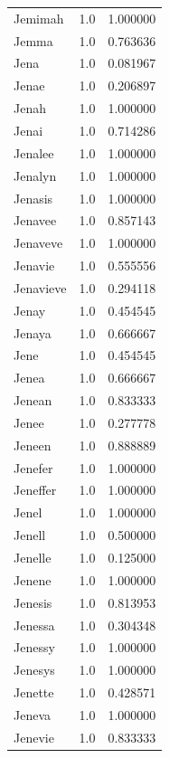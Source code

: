 \documentclass[
  letterpaper,
  DIV=11,
  numbers=noendperiod]{scrreprt}
\begin{document}
\begin{tabular}{lrr}
Jemimah         &   1.0 &   1.000000 \\
Jemma           &   1.0 &   0.763636 \\
Jena            &   1.0 &   0.081967 \\
Jenae           &   1.0 &   0.206897 \\
Jenah           &   1.0 &   1.000000 \\
Jenai           &   1.0 &   0.714286 \\
Jenalee         &   1.0 &   1.000000 \\
Jenalyn         &   1.0 &   1.000000 \\
Jenasis         &   1.0 &   1.000000 \\
Jenavee         &   1.0 &   0.857143 \\
Jenaveve        &   1.0 &   1.000000 \\
Jenavie         &   1.0 &   0.555556 \\
Jenavieve       &   1.0 &   0.294118 \\
Jenay           &   1.0 &   0.454545 \\
Jenaya          &   1.0 &   0.666667 \\
Jene            &   1.0 &   0.454545 \\
Jenea           &   1.0 &   0.666667 \\
Jenean          &   1.0 &   0.833333 \\
Jenee           &   1.0 &   0.277778 \\
Jeneen          &   1.0 &   0.888889 \\
Jenefer         &   1.0 &   1.000000 \\
Jeneffer        &   1.0 &   1.000000 \\
Jenel           &   1.0 &   1.000000 \\
Jenell          &   1.0 &   0.500000 \\
Jenelle         &   1.0 &   0.125000 \\
Jenene          &   1.0 &   1.000000 \\
Jenesis         &   1.0 &   0.813953 \\
Jenessa         &   1.0 &   0.304348 \\
Jenessy         &   1.0 &   1.000000 \\
Jenesys         &   1.0 &   1.000000 \\
Jenette         &   1.0 &   0.428571 \\
Jeneva          &   1.0 &   1.000000 \\
Jenevie         &   1.0 &   0.833333 \\

\end{tabular}
\end{document}
